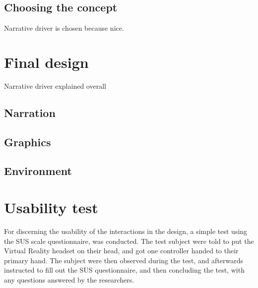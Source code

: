 \subsection{Choosing the concept}
Narrative driver is chosen because nice.

\section{Final design}
Narrative driver explained overall

\subsection{Narration}

\subsection{Graphics}

\subsection{Environment}

\section{Usability test}
    For discerning the usability of the interactions in the design, a simple test using the SUS scale questionnaire, was conducted. The test subject were told to put the Virtual Reality headset on their head, and got one controller handed to their primary hand. The subject were then observed during the test, and afterwards instructed to fill out the SUS questionnaire, and then concluding the test, with any questions answered by the researchers.
